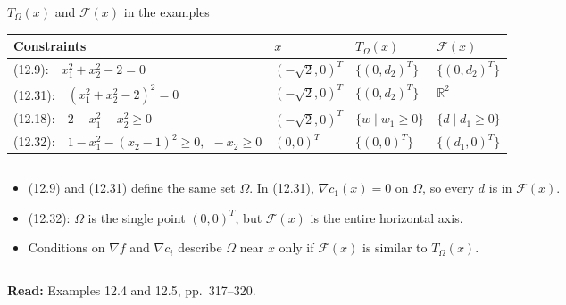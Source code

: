 \documentclass[aspectratio=169,12pt]{beamer}
\newcommand{\R}{\mathbb{R}}
\newcommand{\gradf}{\nabla f}
\newcommand{\readbook}[1]{{\color{red}\textbf{Read:} #1}}
\newcommand{\cF}{\mathcal{F}}
\newcommand{\TO}{T_{\Omega}}
\begin{document}
\begin{frame}{$\TO(x)$ and $\cF(x)$ in the examples}
  \begin{center}\small\setlength\tabcolsep{5pt}
  \begin{tabular}{llll}
    \toprule
    Constraints & $x$ & $\TO(x)$ & $\cF(x)$ \\
    \midrule
    (12.9):\ \ $x_{1}^{2}+x_{2}^{2}-2=0$ & $(-\sqrt2,0)^{T}$ & $\{(0,d_{2})^{T}\}$ & $\{(0,d_{2})^{T}\}$ \\[0.15em]
    (12.31):\ \ $(x_{1}^{2}+x_{2}^{2}-2)^{2}=0$ & $(-\sqrt2,0)^{T}$ & $\{(0,d_{2})^{T}\}$ & $\R^{2}$ \\[0.15em]
    (12.18):\ \ $2-x_{1}^{2}-x_{2}^{2}\ge 0$ & $(-\sqrt2,0)^{T}$ & $\{w\mid w_{1}\ge 0\}$ & $\{d\mid d_{1}\ge 0\}$ \\[0.15em]
    (12.32):\ \ $1-x_{1}^{2}-(x_{2}-1)^{2}\ge 0,\ \ -x_{2}\ge 0$ & $(0,0)^{T}$ & $\{(0,0)^{T}\}$ & $\{(d_{1},0)^{T}\}$ \\
    \bottomrule
  \end{tabular}
  \end{center}
  \begin{columns}[T,totalwidth=\textwidth]
    \begin{column}{0.68\textwidth}
      \begin{itemize}\setlength\itemsep{0.3em}
        \item (12.9) and (12.31) define the same set $\Omega$. In (12.31), $\nabla c_{1}(x)=0$ on $\Omega$,
          so every $d$ is in $\cF(x)$.
        \item (12.32): $\Omega$ is the single point $(0,0)^{T}$, but $\cF(x)$ is the entire horizontal axis.
        \item Conditions on $\gradf$ and $\nabla c_{i}$ describe $\Omega$ near $x$ only if $\cF(x)$
          is similar to $\TO(x)$.
      \end{itemize}
      \vspace{0.2em}
    \end{column}
    \begin{column}{0.30\textwidth}
      \centering
    \end{column}
  \end{columns}
  \readbook{Examples 12.4 and 12.5, pp.~317--320.}
\end{frame}
\end{document}
